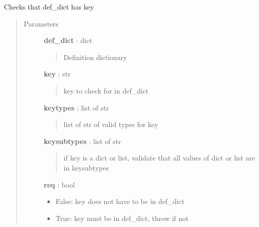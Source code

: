 \documentclass[letterpaper,10pt,english]{sphinxmanual}
\begin{document}
\begin{fulllineitems}
\label{pytan.utils:pytan.utils.chk_def_key}
Checks that def\_dict has key
\begin{quote}\begin{description}
\item[{Parameters}] \leavevmode
\textbf{def\_dict} : dict
\begin{quote}

Definition dictionary
\end{quote}

\textbf{key} : str
\begin{quote}

key to check for in def\_dict
\end{quote}

\textbf{keytypes} : list of str
\begin{quote}

list of str of valid types for key
\end{quote}

\textbf{keysubtypes} : list of str
\begin{quote}

if key is a dict or list, validate that all values of dict or list are in keysubtypes
\end{quote}

\textbf{req} : bool
\begin{itemize}
\item {} 
False: key does not have to be in def\_dict

\item {} 
True: key must be in def\_dict, throw {\hyperref[pytan.utils:pytan.utils.DefinitionParserError]{}} if not

\end{itemize}

\end{description}\end{quote}

\end{fulllineitems}

\end{document}
